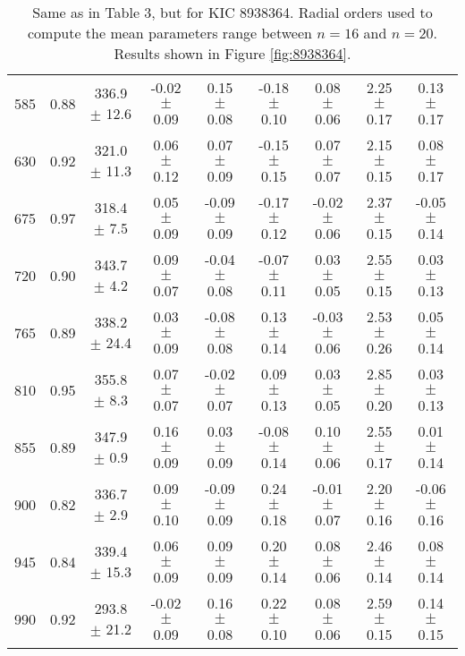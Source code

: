 \documentclass[twocolumn]{aastex61}%
\begin{document}
\begin{table*}[ht]
\begin{tabular}{ccc|ccccc|c}
585 & 0.88 & 336.9 $\pm$ 12.6 & -0.02 $\pm$ 0.09 & 0.15 $\pm$ 0.08 & -0.18 $\pm$ 0.10 & 0.08 $\pm$ 0.06 & 2.25 $\pm$ 0.17 & 0.13 $\pm$ 0.17\\
630 & 0.92 & 321.0 $\pm$ 11.3 & 0.06 $\pm$ 0.12 & 0.07 $\pm$ 0.09 & -0.15 $\pm$ 0.15 & 0.07 $\pm$ 0.07 & 2.15 $\pm$ 0.15 & 0.08 $\pm$ 0.17\\
675 & 0.97 & 318.4 $\pm$ 7.5 & 0.05 $\pm$ 0.09 & -0.09 $\pm$ 0.09 & -0.17 $\pm$ 0.12 & -0.02 $\pm$ 0.06 & 2.37 $\pm$ 0.15 & -0.05 $\pm$ 0.14\\
720 & 0.90 & 343.7 $\pm$ 4.2 & 0.09 $\pm$ 0.07 & -0.04 $\pm$ 0.08 & -0.07 $\pm$ 0.11 & 0.03 $\pm$ 0.05 & 2.55 $\pm$ 0.15 & 0.03 $\pm$ 0.13\\
765 & 0.89 & 338.2 $\pm$ 24.4 & 0.03 $\pm$ 0.09 & -0.08 $\pm$ 0.08 & 0.13 $\pm$ 0.14 & -0.03 $\pm$ 0.06 & 2.53 $\pm$ 0.26 & 0.05 $\pm$ 0.14\\
810 & 0.95 & 355.8 $\pm$ 8.3 & 0.07 $\pm$ 0.07 & -0.02 $\pm$ 0.07 & 0.09 $\pm$ 0.13 & 0.03 $\pm$ 0.05 & 2.85 $\pm$ 0.20 & 0.03 $\pm$ 0.13\\
855 & 0.89 & 347.9 $\pm$ 0.9 & 0.16 $\pm$ 0.09 & 0.03 $\pm$ 0.09 & -0.08 $\pm$ 0.14 & 0.10 $\pm$ 0.06 & 2.55 $\pm$ 0.17 & 0.01 $\pm$ 0.14\\
900 & 0.82 & 336.7 $\pm$ 2.9 & 0.09 $\pm$ 0.10 & -0.09 $\pm$ 0.09 & 0.24 $\pm$ 0.18 & -0.01 $\pm$ 0.07 & 2.20 $\pm$ 0.16 & -0.06 $\pm$ 0.16\\
945 & 0.84 & 339.4 $\pm$ 15.3 & 0.06 $\pm$ 0.09 & 0.09 $\pm$ 0.09 & 0.20 $\pm$ 0.14 & 0.08 $\pm$ 0.06 & 2.46 $\pm$ 0.14 & 0.08 $\pm$ 0.14\\
990 & 0.92 & 293.8 $\pm$ 21.2 & -0.02 $\pm$ 0.09 & 0.16 $\pm$ 0.08 & 0.22 $\pm$ 0.10 & 0.08 $\pm$ 0.06 & 2.59 $\pm$ 0.15 & 0.14 $\pm$ 0.15\\
\end{tabular}
\caption{Same as in Table 3, but for KIC 8938364. Radial orders used to compute the mean parameters range between $n=16$ and $n=20$. Results shown in Figure \ref{fig:8938364}.}\label{tab:8938364}
\end{table*}
\end{document}
